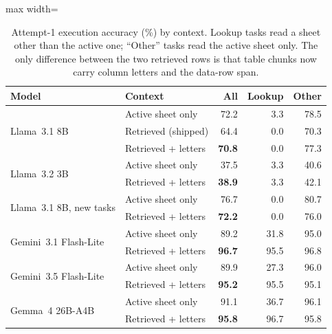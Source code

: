 \begin{table}
\caption{Attempt-1 execution accuracy (\%) by context. Lookup tasks read a sheet other than the active one; ``Other'' tasks read the active sheet only. The only difference between the two retrieved rows is that table chunks now carry column letters and the data-row span.}
\label{tab:e5-context}

\centering\footnotesize
\begin{adjustbox}{max width=\columnwidth}\begin{tabular}{l l rrr}
\toprule
\textbf{Model} & \textbf{Context} & \textbf{All} & \textbf{Lookup} & \textbf{Other} \\
\midrule
\multirow{3}{*}{Llama~3.1 8B} & Active sheet only & 72.2 & 3.3 & 78.5 \\
 & Retrieved (shipped) & 64.4 & 0.0 & 70.3 \\
 & Retrieved + letters & \textbf{70.8} & 0.0 & 77.3 \\
\midrule
\multirow{2}{*}{Llama~3.2 3B} & Active sheet only & 37.5 & 3.3 & 40.6 \\
 & Retrieved + letters & \textbf{38.9} & 3.3 & 42.1 \\
\midrule
\multirow{2}{*}{Llama~3.1 8B, new tasks} & Active sheet only & 76.7 & 0.0 & 80.7 \\
 & Retrieved + letters & \textbf{72.2} & 0.0 & 76.0 \\
\midrule
\multirow{2}{*}{Gemini~3.1 Flash-Lite} & Active sheet only & 89.2 & 31.8 & 95.0 \\
 & Retrieved + letters & \textbf{96.7} & 95.5 & 96.8 \\
\midrule
\multirow{2}{*}{Gemini~3.5 Flash-Lite} & Active sheet only & 89.9 & 27.3 & 96.0 \\
 & Retrieved + letters & \textbf{95.2} & 95.5 & 95.1 \\
\midrule
\multirow{2}{*}{Gemma~4 26B-A4B} & Active sheet only & 91.1 & 36.7 & 96.1 \\
 & Retrieved + letters & \textbf{95.8} & 96.7 & 95.8 \\
\bottomrule
\end{tabular}\end{adjustbox}
\end{table}
